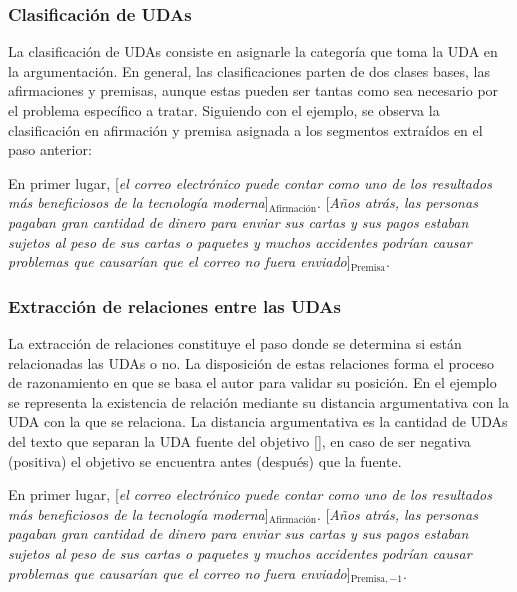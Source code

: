 \subsubsection{Clasificación de UDAs}

La clasificación de UDAs consiste en asignarle la categoría que toma la UDA en la argumentación. En general, 
las clasificaciones parten de dos clases bases, las afirmaciones y premisas, aunque estas pueden ser tantas
como sea necesario por el problema específico a tratar. Siguiendo con el ejemplo, se observa la clasificación
en afirmación y premisa asignada a los segmentos extraídos en el paso anterior:

\begin{adjustwidth}{25pt}{25pt}
    En primer lugar, [\emph{el correo electrónico puede contar como uno de los resultados
    más beneficiosos de la tecnología moderna}]$_{\mathrm{Afirmación}}$. [\emph{Años atrás, las personas pagaban gran cantidad de dinero para 
    enviar sus cartas y sus pagos estaban sujetos al peso de sus cartas o paquetes y muchos accidentes podrían 
    causar problemas que causarían que el correo no fuera enviado}]$_{\mathrm{Premisa}}$.
\end{adjustwidth}

\subsubsection{Extracción de relaciones entre las UDAs}

La extracción de relaciones constituye el paso donde se determina si están relacionadas las UDAs o no. 
La disposición de estas relaciones forma el proceso de razonamiento en que se basa el autor para validar 
su posición. En el ejemplo se representa la existencia de relación mediante su distancia argumentativa con 
la UDA con la que se relaciona. La distancia argumentativa es la cantidad de UDAs del texto que separan la 
UDA fuente del objetivo [\cite{galassi2021deep}], en caso de ser negativa (positiva) el objetivo se encuentra 
antes (después) que la fuente.

\begin{adjustwidth}{25pt}{25pt}
    En primer lugar, [\emph{el correo electrónico puede contar como uno de los resultados
    más beneficiosos de la tecnología moderna}]$_{\mathrm{Afirmación}}$. [\emph{Años atrás, las personas pagaban gran cantidad de dinero para 
    enviar sus cartas y sus pagos estaban sujetos al peso de sus cartas o paquetes y muchos accidentes podrían 
    causar problemas que causarían que el correo no fuera enviado}]$_{\mathrm{Premisa, -1}}$.
\end{adjustwidth}

